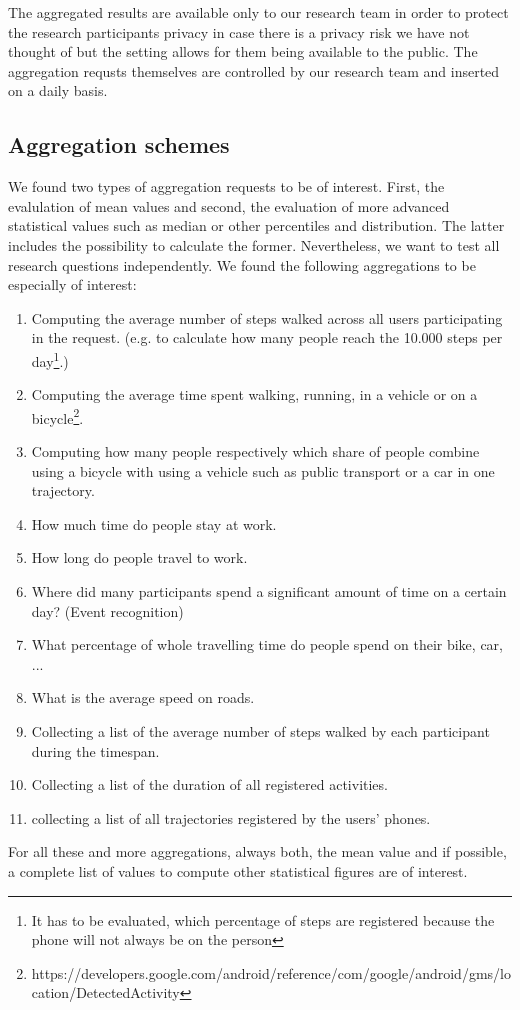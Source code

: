  The aggregated results are available only to our research team in order to protect the research participants privacy in case there is a privacy risk we have not thought of but the setting allows for them being available to the public. The aggregation requsts themselves are controlled by our research team and inserted on a daily basis.

 \subsection{Aggregation schemes}\label{aggregation-schemes}
 We found two types of aggregation requests to be of interest. First, the evalulation of mean values and second, the evaluation of more advanced statistical values such as median or other percentiles and distribution. The latter includes the possibility to calculate the former. Nevertheless, we want to test all research questions independently.
 We found the following aggregations to be especially of interest:
 \begin{enumerate}
 	\item Computing the average number of steps walked across all users participating in the request. (e.g. to calculate how many people reach the 10.000 steps per day\footnote{It has to be evaluated, which percentage of steps are registered because the phone will not always be on the person}.)
	\item Computing the average time spent walking, running, in a vehicle or on a bicycle\footnote{https://developers.google.com/android/reference/com/google/android/gms/location/DetectedActivity}.
	\item Computing how many people respectively which share of people combine using a bicycle with using a vehicle such as public transport or a car in one trajectory.
	\item How much time do people stay at work.
	\item How long do people travel to work.
	\item Where did many participants spend a significant amount of time on a certain day? (Event recognition)
	\item What percentage of whole travelling time do people spend on their bike, car, ...
	\item What is the average speed on roads.

	\item Collecting a list of the average number of steps walked by each participant during the timespan.
	\item Collecting a list of the duration of all registered activities.

	\item collecting a list of all trajectories registered by the users' phones.
 \end{enumerate}
 For all these and more aggregations, always both, the mean value and if possible, a complete list of values to compute other statistical figures are of interest.

